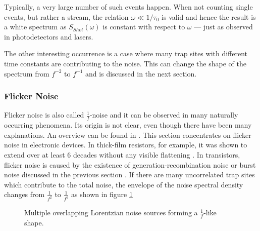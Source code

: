 Typically, a very large number of such events happen. When not counting single events, but rather a stream, the relation $\omega \ll 1/\tau_0$ is valid and hence the result is a white spectrum as $S_{Shot}(\omega)$ is constant with respect to $\omega$ --- just as observed in photodetectors and lasers.

The other interesting occurrence is a case where many trap sites with different time constants are contributing to the noise. This can change the shape of the spectrum from $f^{-2}$ to $f^{-1}$ and is discussed in the next section.

\clearpage
\subsubsection{Flicker Noise}%
\label{sec:flicker_noise}
Flicker noise is also called $\frac 1 f$-noise and it can be observed in many naturally occurring phenomena. Its origin is not clear, even though there have been many explanations. An overview can be found in \cite{flicker_noise_overview, flicker_noise_overview2, origins_1_f_noise}. This section concentrates on flicker noise in electronic devices. In thick-film resistors, for example, it was shown to extend over at least 6 decades without any visible flattening \cite{1_f_noise_thick_film}. In transistors, flicker noise is caused by the existence of generation-recombination noise or burst noise discussed in the previous section \cite{origins_1_f_noise}. If there are many uncorrelated trap sites which contribute to the total noise, the envelope of the noise spectral density changes from $\frac{1}{f^2}$ to $\frac{1}{f^1}$ as shown in figure \ref{fig:flicker_noise_evelope}
\begin{figure}[hb]
    \centering
    \caption{Multiple overlapping Lorentzian noise sources forming a $\frac 1 f$-like shape.}
    \label{fig:flicker_noise_evelope}
\end{figure}

